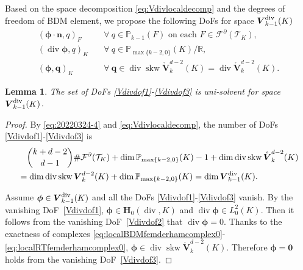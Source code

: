 \documentclass[10pt]{amsart}
\newtheorem{lemma}[theorem]{Lemma}
\renewcommand{\div}{\operatorname{div}}
\newcommand{\skw}{\operatorname{skw}}
\numberwithin{equation}{section}
\begin{document}
Based on the space decomposition \eqref{eq:Vdivlocaldecomp} and the degrees of freedom of BDM element, we propose the following DoFs for space $\boldsymbol{V}_{k-1}^{\rm div}(K)$
\begin{align}
    (\boldsymbol{\phi}\cdot\boldsymbol{n}, q)_F & \quad\forall~q\in\mathbb P_{k-1}(F) \textrm{ on each }  F\in\mathcal F^{\partial}(\mathcal T_K), \label{Vdivdof1}\\
    (\div\boldsymbol{\phi}, q)_K & \quad\forall~q\in\mathbb P_{\max\{k-2,0\}}(K)/\mathbb R, \label{Vdivdof2} \\
    (\boldsymbol{\phi}, \boldsymbol{q})_K & \quad\forall~\boldsymbol{q}\in \div\skw\mathring{\boldsymbol{V}}_{k}^{d-2}(K)=\div\mathring{\boldsymbol{V}}_{k}^{d-2}(K). \label{Vdivdof3}
\end{align}
\begin{lemma}
The set of DoFs \eqref{Vdivdof1}-\eqref{Vdivdof3} is uni-solvent for space $\boldsymbol{V}_{k-1}^{\rm div}(K)$.
\end{lemma}
\begin{proof}
By \eqref{eq:20220324-4} and \eqref{eq:Vdivlocaldecomp},
the number of DoFs \eqref{Vdivdof1}-\eqref{Vdivdof3} is
\begin{align*}
&\quad {k+d-2\choose d-1}\#\mathcal F^{\partial}(\mathcal T_K)+\dim\mathbb P_{\max\{k-2,0\}}(K)-1+\dim\div\skw\mathring{\boldsymbol{V}}_{k}^{d-2}(K) \\
&=\dim\div\skw\boldsymbol{V}_{k}^{d-2}(K)+\dim\mathbb P_{\max\{k-2,0\}}(K)=\dim\boldsymbol{V}_{k-1}^{\rm div}(K).
\end{align*}

Assume $\boldsymbol{\phi}\in\boldsymbol{V}_{k-1}^{\rm div}(K)$ and all the DoFs \eqref{Vdivdof1}-\eqref{Vdivdof3} vanish. By the vanishing DoF~\eqref{Vdivdof1}, $\boldsymbol{\phi}\in \boldsymbol{H}_0(\div, K)$ and $\div\boldsymbol{\phi}\in L_0^2(K)$. Then it follows from the vanishing DoF~\eqref{Vdivdof2} that $\div\boldsymbol{\phi}=0$. 
Thanks to the exactness of complexes \eqref{eq:localBDMfemderhamcomplex0}-\eqref{eq:localRTfemderhamcomplex0}, $\boldsymbol{\phi}\in\div\skw\mathring{\boldsymbol{V}}_{k}^{d-2}(K)$. Therefore $\boldsymbol{\phi}=\boldsymbol{0}$ holds from the vanishing DoF~\eqref{Vdivdof3}.
\end{proof}
\end{document}
